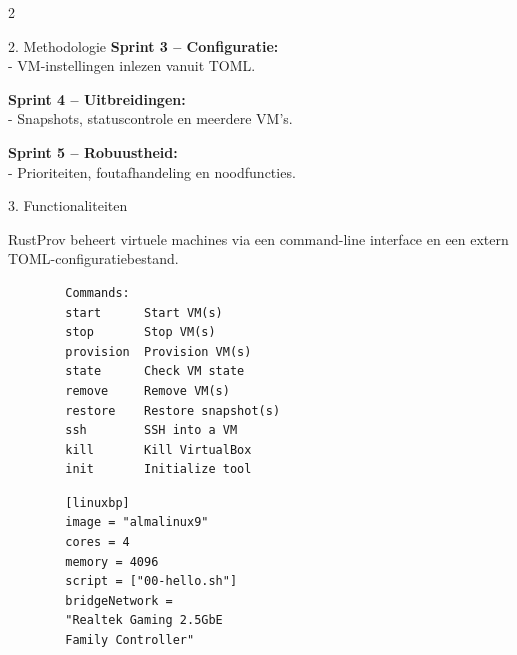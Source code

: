 \documentclass[a0,portrait]{hogent-poster}
\begin{document}
\begin{multicols}{2}
\begin{posterbox}{2. Methodologie}
\textbf{Sprint 3 -- Configuratie:}\\
- VM-instellingen inlezen vanuit TOML.

\vspace{1.5mm}

\textbf{Sprint 4 -- Uitbreidingen:}\\
- Snapshots, statuscontrole en meerdere VM's.

\vspace{1.5mm}

\textbf{Sprint 5 -- Robuustheid:}\\
- Prioriteiten, foutafhandeling en noodfuncties.
    
\end{posterbox}




\begin{posterbox}{3. Functionaliteiten}

RustProv beheert virtuele machines via een command-line interface en een extern
TOML-configuratiebestand.

\vspace{0.5cm}

\noindent
\begin{minipage}[t]{0.48\columnwidth}
    \centering
    \scriptsize
    \begin{verbatim}
        Commands:
        start      Start VM(s)
        stop       Stop VM(s)
        provision  Provision VM(s)
        state      Check VM state
        remove     Remove VM(s)
        restore    Restore snapshot(s)
        ssh        SSH into a VM
        kill       Kill VirtualBox
        init       Initialize tool
    \end{verbatim}
    
\end{minipage}%
\hfill
\begin{minipage}[t]{0.48\columnwidth}
    \centering
    \scriptsize
    \begin{verbatim}
        [linuxbp]
        image = "almalinux9"
        cores = 4
        memory = 4096
        script = ["00-hello.sh"]
        bridgeNetwork = 
        "Realtek Gaming 2.5GbE 
        Family Controller"
    \end{verbatim}
    
\end{minipage}
\end{posterbox}



\end{multicols}
\end{document}
